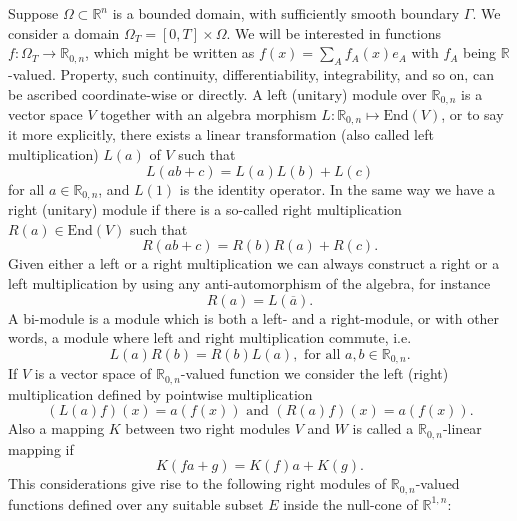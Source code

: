 \documentclass[12pt]{amsart}
\theoremstyle{definition}
\newcommand{\R}{\mathbb{R}}
\newcommand{\ba}{\overline}
\begin{document}
Suppose $\Omega\subset\mathbb{R}^{n}$ is a bounded domain, with sufficiently smooth boundary $\Gamma$. We consider a domain $\Omega_T=[0,T]\times\Omega$. We will be interested in functions $f:\Omega_T \rightarrow\R_{0,n}$, which might be written as $f(x)=\sum_{A}f_A(x)e_A$ with $f_A$ being $\R$-valued. Property, such continuity, differentiability, integrability, and so on, can be ascribed coordinate-wise or directly. A left (unitary) module over $\R_{0,n}$ is a vector space $V$ together with an algebra morphism $L:\R_{0,n}\mapsto \mathrm{End}(V)$, or to say it more explicitly, there exists a linear transformation (also called left multiplication) $L(a)$ of $V$ such that
$$
L(ab+c)=L(a)L(b)+L(c)
$$ 
for all $a\in\R_{0,n}$, and $L(1)$ is the identity operator. In the same way we have a right (unitary) module if there is a so-called right multiplication $R(a)\in  \mathrm{End}(V)$ such that
$$
R(ab+c)=R(b)R(a)+R(c).
$$
Given either a left or a right multiplication we can always construct a right or a left multiplication by using any anti-automorphism of the algebra, for instance
$$
R(a)=L(\ba{a}).
$$
A bi-module is a module which is both a left- and a right-module, or with other words, a module where left and right multiplication commute, i.e. 
$$
L(a)R(b)=R(b)L(a), \mbox{ for all }a,b\in \R_{0,n}.
$$
If $V$ is a vector space of $\R_{0,n}$-valued function we consider the left (right) multiplication defined by pointwise multiplication
$$
(L(a)f)(x)=a(f(x)) \mbox{ and } (R(a)f)(x)=a(f(x)).
$$
Also a mapping $K$ between two right modules $V$ and $W$ is called a $\R_{0,n}$-linear mapping if
$$
K(fa+g)=K(f)a+K(g).
$$
This considerations give rise to the following right modules of $\R_{0,n}$-valued functions defined over any suitable subset $E$ inside the null-cone of $\R^{1,n}$:
\end{document}
